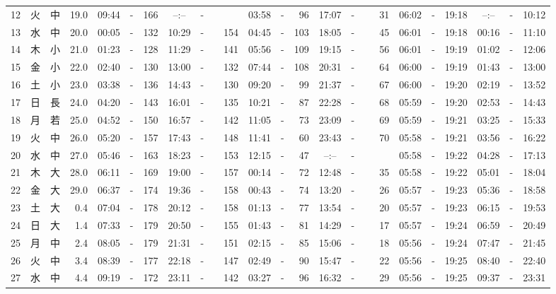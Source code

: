 \documentclass[12pt,a4j]{jsarticle}
\begin{document}
\begin{table}[htbp]
\begin{center}
{\begin{tabular}{|rc|cr|ccrccr|ccrccr|ccc|ccc|}
12 & 火 & 中 & 19.0 &  09:44 &-& 166 &  --:-- &-&~~~~~ &  03:58 &-&  96 &  17:07 &-&  31 & 06:02 & -& 19:18 & --:-- & -& 10:12 \\
13 & 水 & 中 & 20.0 &  00:05 &-& 132 &  10:29 &-& 154 &  04:45 &-& 103 &  18:05 &-&  45 & 06:01 & -& 19:18 & 00:16 & -& 11:10 \\
14 & 木 & 小 & 21.0 &  01:23 &-& 128 &  11:29 &-& 141 &  05:56 &-& 109 &  19:15 &-&  56 & 06:01 & -& 19:19 & 01:02 & -& 12:06 \\
15 & 金 & 小 & 22.0 &  02:40 &-& 130 &  13:00 &-& 132 &  07:44 &-& 108 &  20:31 &-&  64 & 06:00 & -& 19:19 & 01:43 & -& 13:00 \\
16 & 土 & 小 & 23.0 &  03:38 &-& 136 &  14:43 &-& 130 &  09:20 &-&  99 &  21:37 &-&  67 & 06:00 & -& 19:20 & 02:19 & -& 13:52 \\
17 & 日 & 長 & 24.0 &  04:20 &-& 143 &  16:01 &-& 135 &  10:21 &-&  87 &  22:28 &-&  68 & 05:59 & -& 19:20 & 02:53 & -& 14:43 \\
18 & 月 & 若 & 25.0 &  04:52 &-& 150 &  16:57 &-& 142 &  11:05 &-&  73 &  23:09 &-&  69 & 05:59 & -& 19:21 & 03:25 & -& 15:33 \\
19 & 火 & 中 & 26.0 &  05:20 &-& 157 &  17:43 &-& 148 &  11:41 &-&  60 &  23:43 &-&  70 & 05:58 & -& 19:21 & 03:56 & -& 16:22 \\
20 & 水 & 中 & 27.0 &  05:46 &-& 163 &  18:23 &-& 153 &  12:15 &-&  47 &  --:-- &-&~~~~~ & 05:58 & -& 19:22 & 04:28 & -& 17:13 \\
21 & 木 & 大 & 28.0 &  06:11 &-& 169 &  19:00 &-& 157 &  00:14 &-&  72 &  12:48 &-&  35 & 05:58 & -& 19:22 & 05:01 & -& 18:04 \\
22 & 金 & 大 & 29.0 &  06:37 &-& 174 &  19:36 &-& 158 &  00:43 &-&  74 &  13:20 &-&  26 & 05:57 & -& 19:23 & 05:36 & -& 18:58 \\
23 & 土 & 大 &  0.4 &  07:04 &-& 178 &  20:12 &-& 158 &  01:13 &-&  77 &  13:54 &-&  20 & 05:57 & -& 19:23 & 06:15 & -& 19:53 \\
24 & 日 & 大 &  1.4 &  07:33 &-& 179 &  20:50 &-& 155 &  01:43 &-&  81 &  14:29 &-&  17 & 05:57 & -& 19:24 & 06:59 & -& 20:49 \\
25 & 月 & 中 &  2.4 &  08:05 &-& 179 &  21:31 &-& 151 &  02:15 &-&  85 &  15:06 &-&  18 & 05:56 & -& 19:24 & 07:47 & -& 21:45 \\
26 & 火 & 中 &  3.4 &  08:39 &-& 177 &  22:18 &-& 147 &  02:49 &-&  90 &  15:47 &-&  22 & 05:56 & -& 19:25 & 08:40 & -& 22:40 \\
27 & 水 & 中 &  4.4 &  09:19 &-& 172 &  23:11 &-& 142 &  03:27 &-&  96 &  16:32 &-&  29 & 05:56 & -& 19:25 & 09:37 & -& 23:31 \\

\end{tabular}}
\end{center}
\end{table}
\end{document}

